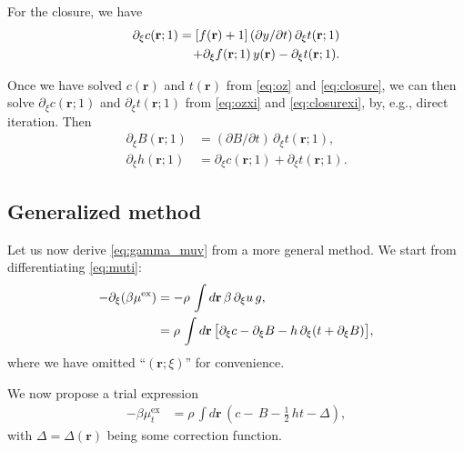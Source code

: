\documentclass[aip,jcp,reprint,superscriptaddress]{revtex4-1}
\newcommand{\vct}[1]{\mathbf{#1}}
\providecommand{\vr}{} %
\renewcommand{\vr}{\vct{r}}
\newcommand{\supex}[1]{ { { #1 }^{ \mathrm{ex} } } }
\newcommand{\muex}{\supex{\mu}}
\newcommand{\mutex}{\mu^{ \mathrm{ex} }_t}
\begin{document}
For the closure, we have
\begin{align}
  \partial_\xi c(\vr; 1)
  = [f(\vr) + 1] \, (\partial y/\partial t) \, \partial_\xi t(\vr; 1)
  \notag \\
  + \partial_\xi f(\vr; 1) \, y(\vr) - \partial_\xi t(\vr; 1).
  \label{eq:closurexi}
\end{align}

Once we have solved $c(\vr)$ and $t(\vr)$
from \eqref{eq:oz} and \eqref{eq:closure},
%
we can then solve $\partial_\xi c(\vr; 1)$ and $\partial_\xi t(\vr; 1)$
from \eqref{eq:ozxi} and \eqref{eq:closurexi}, by, e.g., direct iteration.
Then
\begin{align*}
  \partial_\xi B(\vr; 1) &= (\partial B/\partial t) \, \partial_\xi t(\vr; 1), \\
  \partial_\xi h(\vr; 1) &= \partial_\xi c(\vr; 1) + \partial_\xi t(\vr; 1).
\end{align*}



\subsection{\label{sec:genmethod}Generalized method}



Let us now derive \eqref{eq:gamma_muv} from a more general method.
%
We start from differentiating \eqref{eq:muti}:
%
\begin{align}
  -\partial_\xi ( \beta \muex )
  &=
  -\rho \, \int d\vr
    \, \beta \, \partial_\xi u \, g,
    \notag \\
  &=
  \rho \, \int d\vr \,
    \big[
    \partial_\xi c - \partial_\xi B
  - h \, \partial_\xi (t + \partial_\xi B )
    \big],
  \label{eq:dmuti}
\end{align}
%
where we have omitted ``$(\vr; \xi)$'' for convenience.

We now propose a trial expression
%
\begin{align}
  - \beta \mutex
  &=
  \rho \, \int d\vr \,
    \left(
    c
    - \, B
    - \tfrac{1}{2} \, h t
    - \Delta
    \right),
  \label{eq:mutrial}
\end{align}
%
with $\Delta = \Delta(\vr)$ being some correction function.
\end{document}
